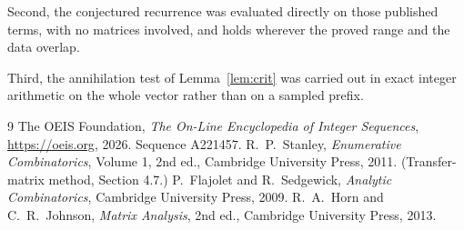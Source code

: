 \documentclass[11pt,a4paper]{article}
\theoremstyle{plain}
\theoremstyle{definition}
\begin{document}
Second, the conjectured recurrence was evaluated directly on those published terms, with no
matrices involved, and holds wherever the proved range and the data overlap.

Third, the annihilation test of Lemma~\ref{lem:crit} was carried out in exact integer
arithmetic on the whole vector rather than on a sampled prefix.

\begin{thebibliography}{9}
 The OEIS Foundation, \emph{The On-Line Encyclopedia of Integer
Sequences}, \url{https://oeis.org}, 2026. Sequence A221457.
 R.~P.~Stanley, \emph{Enumerative Combinatorics}, Volume 1, 2nd ed.,
Cambridge University Press, 2011. (Transfer-matrix method, Section 4.7.)
 P.~Flajolet and R.~Sedgewick, \emph{Analytic Combinatorics}, Cambridge
University Press, 2009.
 R.~A.~Horn and C.~R.~Johnson, \emph{Matrix Analysis}, 2nd ed., Cambridge
University Press, 2013.
\end{thebibliography}
\end{document}
